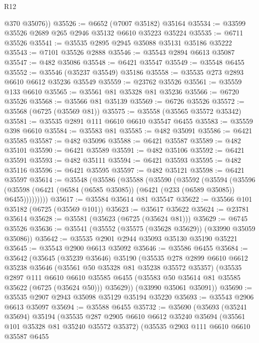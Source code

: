 \begin{lexlean}{R12}
\begin{coremodule}
        @370
        @35076))
@35526 := @6652 (@7007 @35182) @35164
@35534 := @33599 @35526 @2689 @265 @2946 @35132 @6610 @35223 @35224
@35535 := @6711 @35526
@35541 := @35535 @2895 @2945 @35088 @35131 @35186 @35222
@35543 := @7101 @35526 @2888
@35546 := @35543 @2894 @6613 @35087
@35547 := @482 @35086
@35548 := @6421 @35547
@35549 := @35548 @6455
@35552 := @35546 (@35237 @35549) @35186
@35558 := @35535 @273 @2893 @6610 @6612 @35236 @35549
@35559 := @23762 @35526
@35561 := @35559 @133 @6610
@35565 := @35561 @81 @35328 @81 @35236
@35566 := @6720 @35526
@35568 := @35566 @81 @35139
@35569 := @6726 @35526
@35572 := @35568 (@6725 (@35569 @81))
@35575 := @35558 (@35565 @35572 @35342)
@35581 := @35535 @2891 @111 @6610 @6610 @35547 @6455
@35583 := @35559 @398 @6610
@35584 := @35583 @81
@35585 := @482 @35091
@35586 := @6421 @35585
@35587 := @482 @35096
@35588 := @6421 @35587
@35589 := @482 @35101
@35590 := @6421 @35589
@35591 := @482 @35106
@35592 := @6421 @35591
@35593 := @482 @35111
@35594 := @6421 @35593
@35595 := @482 @35116
@35596 := @6421 @35595
@35597 := @482 @35121
@35598 := @6421 @35597
@35614 := @35548
    (@35586
      (@35588
        (@35590
          (@35592
            (@35594
              (@35596
                (@35598 (@6421 (@6584 (@6585 @35085)) (@6421 (@233 (@6589 @35085)) @6455)))))))))
@35617 := @35584 @35614 @81 @35547
@35622 := @35566 @101 @35182 (@6725 (@35569 @101))
@35623 := @35617 @35622
@35624 := @23781 @35614
@35628 := @35581 (@35623 (@6725 (@35624 @81)))
@35629 := @6745 @35526
@35636 := @35541 (@35552 (@35575 (@35628 @35629)) (@33990 @35059 @35086))
@35642 := @35535 @2901 @2944 @35093 @35130 @35190 @35221
@35645 := @35543 @2900 @6613 @35092
@35646 := @35586 @6455
@35684 := @35642
    (@35645
      (@35239 @35646)
      @35190
      (@35535
        @278
        @2899
        @6610
        @6612
        @35238
        @35646
        (@35561 @50 @35328 @81 @35238 @35572 @35357)
        (@35535
          @2897
          @111
          @6610
          @6610
          @35585
          @6455
          (@35583 @50 @35614 @81 @35585 @35622 (@6725 (@35624 @50)))
          @35629))
      (@33990 @35061 @35091))
@35690 := @35535 @2907 @2943 @35098 @35129 @35194 @35220
@35693 := @35543 @2906 @6613 @35097
@35694 := @35588 @6455
@35732 := @35690
    (@35693
      (@35241 @35694)
      @35194
      (@35535
        @287
        @2905
        @6610
        @6612
        @35240
        @35694
        (@35561 @101 @35328 @81 @35240 @35572 @35372)
        (@35535
          @2903
          @111
          @6610
          @6610
          @35587
          @6455

\end{coremodule}
\end{lexlean}
